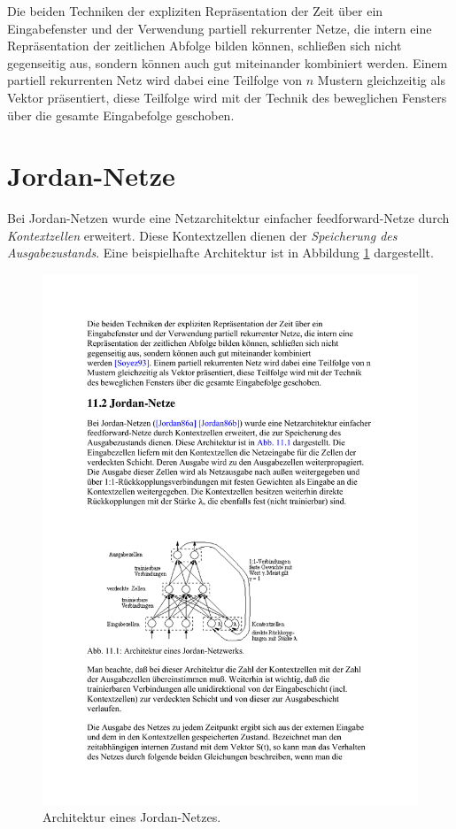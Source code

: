 Die beiden Techniken der expliziten Repräsentation der Zeit über ein Eingabefenster und der Verwendung partiell rekurrenter Netze, die intern eine Repräsentation der zeitlichen Abfolge bilden können, schließen sich nicht gegenseitig aus, sondern können auch gut miteinander kombiniert
werden.
Einem partiell rekurrenten Netz wird dabei eine Teilfolge von $n$
Mustern gleichzeitig als Vektor präsentiert, diese Teilfolge wird mit der Technik des beweglichen Fensters über die gesamte Eingabefolge geschoben.



\section*{Jordan-Netze}
Bei Jordan-Netzen wurde eine Netzarchitektur einfacher feedforward-Netze durch \emph{Kontextzellen} erweitert. Diese Kontextzellen dienen der \emph{Speicherung des Ausgabezustands}.
Eine beispielhafte Architektur ist in Abbildung \ref{fig:ch04_jordan-netze} dargestellt.

\begin{figure}[ht!] \centering 
	\includegraphics[width=\linewidth]{figures/ch04_jordan-netze.pdf}
	\caption{Architektur eines Jordan-Netzes.}
	\label{fig:ch04_jordan-netze}
\end{figure}

